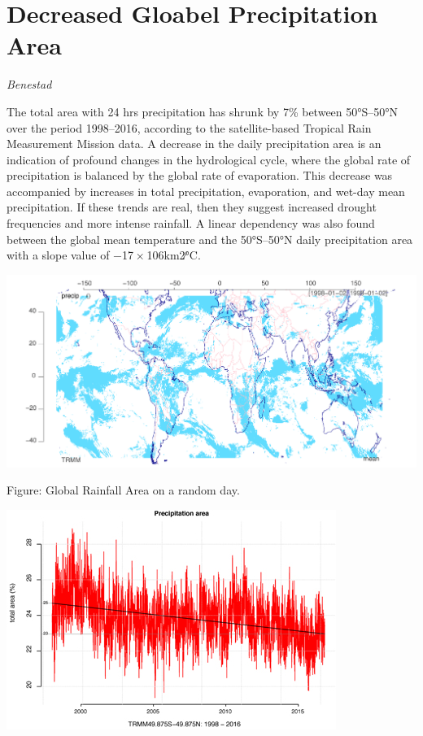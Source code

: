 \documentclass[
]{book}
\begin{document}
\hypertarget{decreased-gloabel-precipitation-area}{%
\section{Decreased Gloabel Precipitation Area}\label{decreased-gloabel-precipitation-area}}

\emph{Benestad}

The total area with 24 hrs precipitation has shrunk by 7\% between 50°S--50°N over the period 1998--2016, according to the satellite-based Tropical Rain Measurement Mission data. A decrease in the daily precipitation area is an indication of profound changes in the hydrological cycle, where the global rate of precipitation is balanced by the global rate of evaporation. This decrease was accompanied by increases in total precipitation, evaporation, and wet-day mean precipitation. If these trends are real, then they suggest increased drought frequencies and more intense rainfall.
A linear dependency was also found between the global mean temperature and the 50°S--50°N daily precipitation area with a slope value of −17 × 106km2∕°C.

\includegraphics{fig/rainfall_area_random_day.jpg}

Figure: Global Rainfall Area on a random day.

\includegraphics{fig/rainfall_area_trend.jpg}
\end{document}

